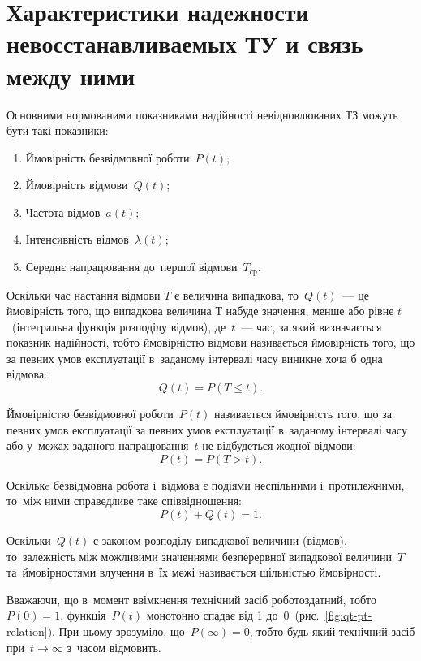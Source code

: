 \documentclass[
	a4paper,
	oneside,
	DIV = 14,
	fontsize = 14pt,
	headings = normal,
]{scrartcl}
\begin{document}
	\section{Характеристики надежности невосстанавливаемых ТУ и связь между ними}
		Основними нормованими показниками надійності невідновлюваних ТЗ можуть бути такі показники:
	\begin{enumerate}
		\item Ймовірність безвідмовної роботи~$P(t)$;
		\item Ймовірність відмови~$Q(t)$;
		\item Частота відмов~$a(t)$;
		\item Інтенсивність відмов~$\lambda (t)$;
		\item Середнє напрацювання до~першої відмови~$T_{\text{ср}}$.
	\end{enumerate}

		Оскільки час настання відмови $T$ є величина випадкова, то~$Q(t)$~— це ймовірність того, що випадкова величина $Т$ набуде значення, менше або рівне $t$~(інтегральна функція розподілу відмов), де~$t$~— час, за який визначається показник надійності, тобто ймовірністю відмови називається ймовірність того, що за певних умов експлуатації в~заданому інтервалі часу виникне хоча б одна відмова:
		\[
			Q(t) = P(T \leqslant t).
		\]

		Ймовірністю безвідмовної роботи~$P(t)$ називається ймовірність того, що за певних умов експлуатації за певних умов експлуатації в~заданому інтервалі часу або у~межах заданого напрацювання~$t$ не відбудеться жодної відмови:
		\[
			P(t) = P(T > t).
		\]

		Оскількe безвідмовна робота і~відмова є подіями неспільними і~протилежними, то~між ними справедливе таке співвідношення:
		\[
			P(t) + Q(t) = 1.
			\]

			Оскільки~$Q(t)$ є законом розподілу випадкової величини (відмов), то~залежність між можливими значеннями безперервної випадкової величини~$T$ та~ймовірностями влучення в~їх межі називається щільністью ймовірності.

			Вважаючи, що в~момент ввімкнення технічний засіб роботоздатний, тобто~$P(0) = 1$, функція~$P(t)$ монотонно спадає від 1 до~0~(рис.~\ref{fig:qt-pt-relation}). При цьому зрозуміло, що~$P(\infty) = 0$, тобто будь-який технічний засіб при~$t \to \infty$ з~часом відмовить.
\end{document}
